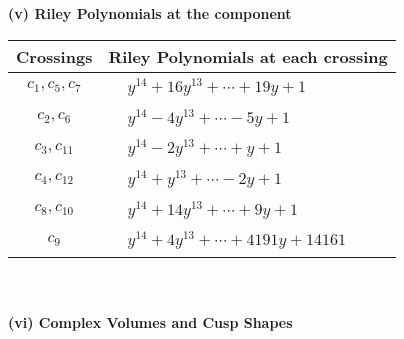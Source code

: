 \documentclass[1p]{elsarticle_modified}
\theoremstyle{definition}
\begin{document}
\newpage\renewcommand{\arraystretch}{1}
\flushleft \textbf{(v) Riley Polynomials at the component}\newline \\
\begin{tabular}{m{50pt}|m{274pt}}
Crossings & \hspace{64pt}Riley Polynomials at each crossing \\
\hline $$\begin{aligned}c_{1},c_{5},c_{7}\end{aligned}$$&$\begin{aligned}
&y^{14}+16 y^{13}+\cdots+19 y+1
\end{aligned}$\\
\hline $$\begin{aligned}c_{2},c_{6}\end{aligned}$$&$\begin{aligned}
&y^{14}-4 y^{13}+\cdots-5 y+1
\end{aligned}$\\
\hline $$\begin{aligned}c_{3},c_{11}\end{aligned}$$&$\begin{aligned}
&y^{14}-2 y^{13}+\cdots+y+1
\end{aligned}$\\
\hline $$\begin{aligned}c_{4},c_{12}\end{aligned}$$&$\begin{aligned}
&y^{14}+y^{13}+\cdots-2 y+1
\end{aligned}$\\
\hline $$\begin{aligned}c_{8},c_{10}\end{aligned}$$&$\begin{aligned}
&y^{14}+14 y^{13}+\cdots+9 y+1
\end{aligned}$\\
\hline $$\begin{aligned}c_{9}\end{aligned}$$&$\begin{aligned}
&y^{14}+4 y^{13}+\cdots+4191 y+14161
\end{aligned}$\\
\hline
\end{tabular}\\~\\
\newpage\flushleft \textbf{(vi) Complex Volumes and Cusp Shapes}
\end{document}
